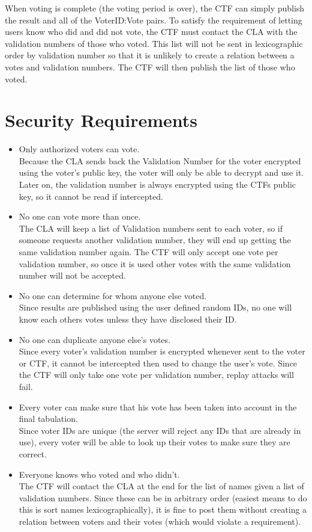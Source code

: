 \documentclass{article} \usepackage[margin=1in]{geometry} \usepackage{amsmath}
\begin{document}
When voting is complete (the voting period is over), the CTF can simply publish the result and all of the VoterID:Vote pairs. To satisfy the requirement of letting users know who did and did not vote, the CTF must contact the CLA with the validation numbers of those who voted. This list will not be sent in lexicographic order by validation number so that it is unlikely to create a relation between a votes and validation numbers. The CTF will then publish the list of those who voted. \\

\section{Security Requirements}

\begin{itemize}
  \item Only authorized voters can vote. \\
		Because the CLA sends back the Validation Number for the voter encrypted
		using the voter's public key, the voter will only be able to decrypt and
		use it. Later on, the validation number is always encrypted using the CTFs
		public key, so it cannot be read if intercepted.
	\item No one can vote more than once. \\
		The CLA will keep a list of Validation numbers sent to each voter, so if
		someone requests another validation number, they will end up getting the
		same validation number again. The CTF will only accept one vote per
		validation number, so once it is used other votes with the same validation
		number will not be accepted.
	\item No one can determine for whom anyone else voted. \\
		Since results are published using the user defined random IDs, no one will
		know each others votes unless they have disclosed their ID.
	\item No one can duplicate anyone else's votes. \\
		Since every voter's validation number is encrypted whenever sent to the
		voter or CTF, it cannot be intercepted then used to change the user's vote.
		Since the CTF will only take one vote per validation number, replay attacks
		will fail.	
	\item Every voter can make sure that his vote has been taken into account in the final tabulation. \\
		Since voter IDs are unique (the server will reject any IDs that are already
		in use), every voter will be able to look up their votes to make sure they
		are correct.
	\item Everyone knows who voted and who didn't. \\
		The CTF will contact the CLA at the end for the list of names given a list of validation numbers. Since these can be in arbitrary order (easiest means to do this is sort names lexicographically), it is fine to post them without creating a relation between voters and their votes (which would violate a requirement). 
\end{itemize}
\end{document}
